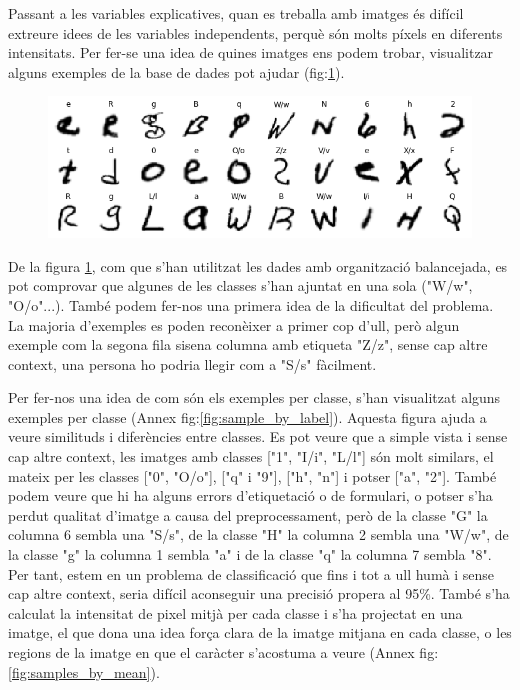 \documentclass[12pt, spanish]{article}
\begin{document}
Passant a les variables explicatives, quan es treballa amb imatges és difícil extreure idees de les variables independents, perquè són molts píxels en diferents intensitats. Per fer-se una idea de quines imatges ens podem trobar, visualitzar alguns exemples de la base de dades pot ajudar (fig:\ref{fig:sample_random}).

\begin{figure}[hbt!]
\centering
	\includegraphics[width=1\textwidth]{images/samples_balanced.png}
	\label{fig:sample_random}
\end{figure}

De la figura \ref{fig:sample_random}, com que s'han utilitzat les dades amb organització balancejada, es pot comprovar que algunes  de les classes s'han ajuntat en una sola ("W/w", "O/o"...). També podem fer-nos una primera idea de la dificultat del problema. La majoria d'exemples es poden reconèixer a primer cop d'ull, però algun exemple com la segona fila sisena columna amb etiqueta "Z/z", sense cap altre context, una persona ho podria llegir com a "S/s" fàcilment.

Per fer-nos una idea de com són els exemples per classe, s'han visualitzat alguns exemples per classe (Annex fig:\ref{fig:sample_by_label}). Aquesta figura ajuda a veure similituds i diferències entre classes. Es pot veure que a simple vista i sense cap altre context, les imatges amb classes ["1", "I/i", "L/l"] són molt similars, el mateix per les classes ["0", "O/o"], ["q" i "9"], ["h", "n"] i potser ["a", "2"]. També podem veure que hi ha alguns errors d'etiquetació o de formulari, o potser s'ha perdut qualitat d'imatge a causa del preprocessament, però de la classe "G" la columna 6 sembla una "S/s", de la classe "H" la columna 2 sembla una "W/w", de la classe "g" la columna 1 sembla "a" i de la classe "q" la columna 7 sembla "8". Per tant, estem en un problema de classificació que fins i tot a ull humà i sense cap altre context, seria difícil aconseguir una precisió propera al 95\%. També s'ha calculat la intensitat de pixel mitjà per cada classe i s'ha projectat en una imatge, el que dona una idea força clara de la imatge mitjana en cada classe, o les regions de la imatge en que el caràcter s'acostuma a veure (Annex fig:\ref{fig:samples_by_mean}).
\end{document}
